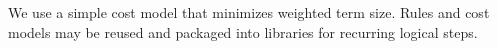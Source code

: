 We use a simple cost model that minimizes weighted term size.
Rules and cost models may be reused and packaged into libraries for recurring logical steps.








